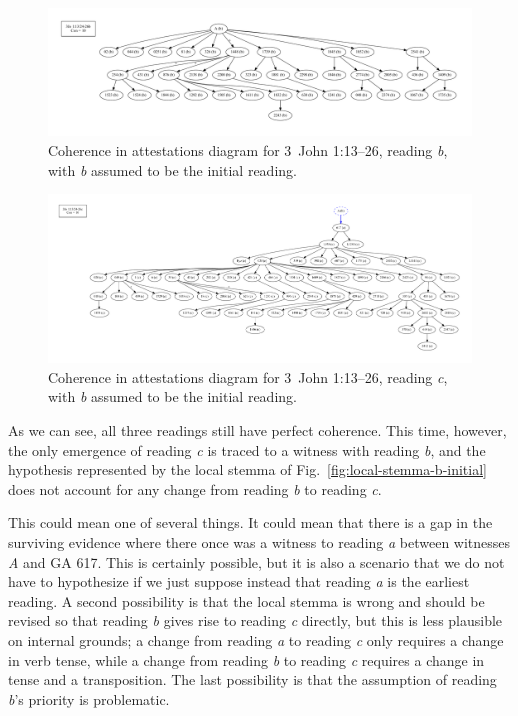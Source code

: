 \documentclass[a4paper, 12pt]{article}
\begin{document}
	\begin{figure}
		\centering
		\includegraphics[scale=0.3333]{../graphics/B25K1V13U24-26Rb-coherence-attestations-2.pdf}
		\caption{Coherence in attestations diagram for 3~John 1:13–26, reading \emph{b}, with \emph{b} assumed to be the initial reading.}
		\label{fig:coherence-b-2}
	\end{figure}
	
	\begin{figure}
		\centering
		\includegraphics[scale=0.3333]{../graphics/B25K1V13U24-26Rc-coherence-attestations-2.pdf}
		\caption{Coherence in attestations diagram for 3~John 1:13–26, reading \emph{c}, with \emph{b} assumed to be the initial reading.}
		\label{fig:coherence-c-2}
	\end{figure}
	
	\newpage
	
	As we can see, all three readings still have perfect coherence. This time, however, the only emergence of reading \emph{c} is traced to a witness with reading \emph{b}, and the hypothesis represented by the local stemma of Fig.~\ref{fig:local-stemma-b-initial} does not account for any change from reading \emph{b} to reading \emph{c}.
	
	This could mean one of several things. It could mean that there is a gap in the surviving evidence where there once was a witness to reading \emph{a} between witnesses \emph{A} and GA 617. This is certainly possible, but it is also a scenario that we do not have to hypothesize if we just suppose instead that reading \emph{a} is the earliest reading. A second possibility is that the local stemma is wrong and should be revised so that reading \emph{b} gives rise to reading \emph{c} directly, but this is less plausible on internal grounds; a change from reading \emph{a} to reading \emph{c} only requires a change in verb tense, while a change from reading \emph{b} to reading \emph{c} requires a change in tense and a transposition. The last possibility is that the assumption of reading \emph{b}'s priority is problematic.
	
\end{document}
